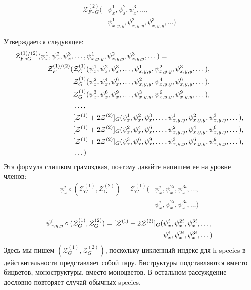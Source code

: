 \begin{equation*}
\begin{split}
\mathcal Z^{(2)}_{F \circ G} (&\psi_x^1, \psi_x^2, \psi_x^3, \dots, \\
						&\psi_{x,y,y}^1, \psi_{x,y,y}^2, \psi_{x,y,y}^3, \dots)
\end{split}
\end{equation*}

Утверждается следующее:
\begin{equation}
\begin{split}
\label{eq:h-zfg}
	\mathcal Z^{(1)/(2)}_{F \circ G} (\psi_x^1, \psi_x^2, \psi_x^3, &\dots, 
	\psi_{x,y,y}^1, \psi_{x,y,y}^2, \psi_{x,y,y}^3, \dots) = \\
	\mathcal Z_F^{(1)/(2)}(
		&\mathcal Z^{(1)}_G(\psi_x^1, \psi_x^2, \psi_x^3, \dots, 
					 \psi_{x, y, y}^1, \psi_{x, y, y}^2, \psi_{x, y, y}^3, \dots), \\
		&\mathcal Z^{(1)}_G(\psi_x^2, \psi_x^4, \psi_x^6, \dots, 
					 \psi_{x, y, y}^2, \psi_{x, y, y}^4, \psi_{x, y, y}^6, \dots), \\
		&\mathcal Z^{(1)}_G(\psi_x^3, \psi_x^6, \psi_x^9, \dots, 
					 \psi_{x, y, y}^3, \psi_{x, y, y}^6, \psi_{x, y, y}^9, \dots), \\
		&\dots, \\
		&[\mathcal Z^{(1)} + 2\mathcal Z^{(2)}]_G(\psi_x^1, \psi_x^2, \psi_x^3, \dots, 
					 \psi_{x,y,y}^1, \psi_{x,y,y}^2, \psi_{x,y,y}^3, \dots), \\
		&[\mathcal Z^{(1)} + 2\mathcal Z^{(2)}]_G(\psi_x^2, \psi_x^4, \psi_x^6, \dots, 
					 \psi_{x,y,y}^2, \psi_{x,y,y}^4, \psi_{x,y,y}^6, \dots), \\
		&[\mathcal Z^{(1)} + 2\mathcal Z^{(2)}]_G(\psi_x^3, \psi_x^6, \psi_x^9, \dots, 
					 \psi_{x,y,y}^3, \psi_{x,y,y}^6, \psi_{x,y,y}^9, \dots), \\
		&\dots
	)
\end{split}	
\end{equation}
Эта формула слишком грамоздкая, поэтому давайте напишем ее на уровне членов:
\begin{equation*}
\begin{split}
\psi_x^i \circ (\mathcal Z^{(1)}_G, \mathcal Z^{(2)}_G ) = \mathcal Z^{(1)}_G
(&\psi_x^i, \psi_x^{2i}, \psi_x^{3i}, \dots, \\
&\psi_x^i, \psi_x^{2i}, \psi_x^{3i}, \dots)
\end{split}
\end{equation*}

\begin{equation*}
\begin{split}
\psi_{x,y,y}^i \circ (\mathcal Z^{(1)}_G, \mathcal Z^{(2)}_G ) = [\mathcal Z^{(1)} + 2\mathcal Z^{(2)}]_G
(&\psi_x^i, \psi_x^{2i}, \psi_x^{3i}, \dots, \\
&\psi_x^i, \psi_x^{2i}, \psi_x^{3i}, \dots)
\end{split}
\end{equation*}
Здесь мы пишем $(\mathcal Z^{(1)}_G, \mathcal Z^{(2)}_G )$, поскольку
цикленный индекс для h-species в действительности представляет собой пару.
Биструктуры подставляются вместо бицветов, моноструктуры, вместо моноцветов. В
остальном рассуждение дословно повторяет случай обычных species.

